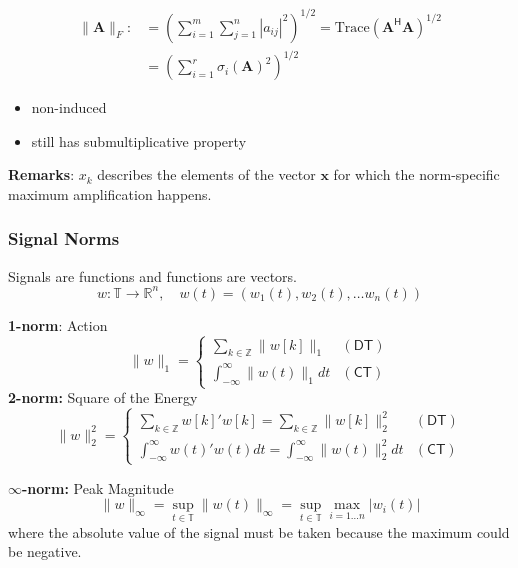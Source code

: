
\noindent\begin{align*}
    \|\mathbf{A}\|_F: & ={\left(\sum_{i=1}^m\sum_{j=1}^n|a_{ij}|^2\right)}^{1/2}=\text{Trace}{(\mathbf{A}^{\mathsf{H}}\mathbf{A})}^{1/2} \\
                      & = {\left(\sum_{i=1}^r\sigma_i{(\mathbf{A})}^2\right)}^{1/2}
\end{align*}

\begin{itemize}
    \item non-induced
    \item still has submultiplicative property
\end{itemize}

\textbf{Remarks}: $x_k$ describes the elements of the vector $\mathbf{x}$ for which the norm-specific maximum amplification happens.

\subsubsection{Signal Norms}
Signals are functions and functions are vectors.
\noindent\begin{equation*}
    w:\mathbb{T}\rightarrow \mathbb{R}^n, \quad w(t)=(w_1(t), w_2(t), \ldots w_n(t))
\end{equation*}

\textbf{1-norm}: Action
\noindent\begin{equation*}
    \|w\|_1=\begin{cases}
        \sum\limits_{k\in\mathbb{Z}}\|w[k]\|_1 & (\mathsf{DT}) \\
        \int_{-\infty}^\infty\|w(t)\|_1 dt     & (\mathsf{CT})
    \end{cases}
\end{equation*}
\newpar{}
\textbf{2-norm:} Square of the Energy
\noindent\begin{equation*}
    \|w\|_2^2=
    \begin{cases}
        \sum\limits_{k\in\mathbb{Z}}w[k]'w[k] = \sum\limits_{k\in\mathbb{Z}}\|w[k]\|_2^2 & \mathsf{(DT)} \\
        \int_{-\infty}^\infty w(t)'w(t) dt = \int_{-\infty}^\infty\|w(t)\|_2^2 dt        & \mathsf{(CT)}
    \end{cases}
\end{equation*}

\newpar{}
\textbf{$\infty$-norm:} Peak Magnitude
\noindent\begin{equation*}
    \|w\|_\infty=\sup_{t\in\mathbb{T}}\|w(t)\|_\infty=\sup_{t\in\mathbb{T}}\max_{i=1\ldots n}|w_i(t)|
\end{equation*}
where the absolute value of the signal must be taken because the maximum could be negative.

